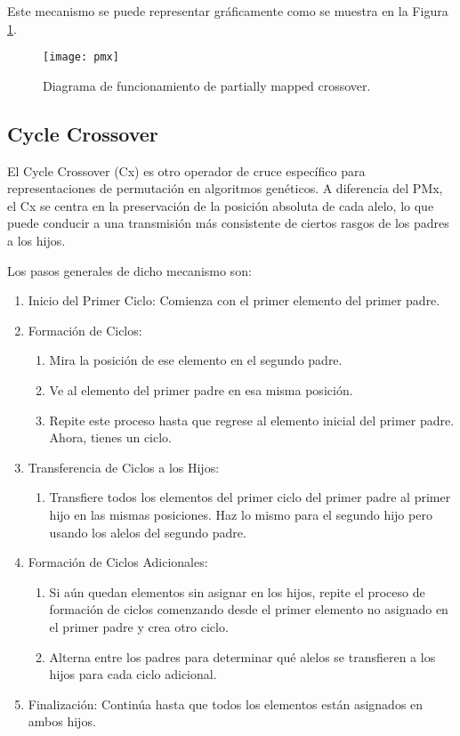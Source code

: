 Este mecanismo se puede representar gráficamente como se muestra en la Figura \ref{fig:PMx}.

\begin{figure}[htbp]
	\centering
	\texttt{[image: pmx]}
	\caption{Diagrama de funcionamiento de partially mapped crossover.}
	\label{fig:PMx}
\end{figure}


\newpage
\subsection{Cycle Crossover}
El Cycle Crossover (Cx) es otro operador de cruce específico para representaciones de permutación en algoritmos genéticos. A diferencia del PMx, el Cx se centra en la preservación de la posición absoluta de cada alelo, lo que puede conducir a una transmisión más consistente de ciertos rasgos de los padres a los hijos.

Los pasos generales de dicho mecanismo son:
\begin{enumerate}
	\item Inicio del Primer Ciclo: Comienza con el primer elemento del primer padre.
	\item Formación de Ciclos:
	\begin{enumerate}
		\item Mira la posición de ese elemento en el segundo padre.
		\item Ve al elemento del primer padre en esa misma posición.
		\item Repite este proceso hasta que regrese al elemento inicial del primer padre. Ahora, tienes un ciclo.
	\end{enumerate}
	\item Transferencia de Ciclos a los Hijos:
	\begin{enumerate}
		\item Transfiere todos los elementos del primer ciclo del primer padre al primer hijo en las mismas posiciones. Haz lo mismo para el segundo hijo pero usando los alelos del segundo padre.
	\end{enumerate}
	\item Formación de Ciclos Adicionales:
	\begin{enumerate}
		\item Si aún quedan elementos sin asignar en los hijos, repite el proceso de formación de ciclos comenzando desde el primer elemento no asignado en el primer padre y crea otro ciclo.
		\item Alterna entre los padres para determinar qué alelos se transfieren a los hijos para cada ciclo adicional.
	\end{enumerate}
	\item Finalización: Continúa hasta que todos los elementos están asignados en ambos hijos.
\end{enumerate}

